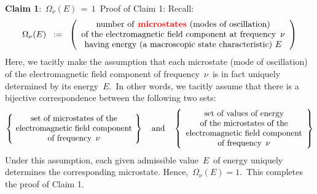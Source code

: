 \vskip 0.4cm
\noindent
\textbf{Claim 1}:\;\,
$\Omega_{\nu}(E) \,=\, 1$\,
\vskip 0.1cm
\noindent
Proof of Claim 1:\;\;
Recall:
\begin{equation*}
\Omega_{\nu}(E)
\;\; := \;\;
    \left(\begin{array}{c}
        \textnormal{number of \textbf{\color{red}microstates} (modes of oscillation)}
        \\
        \textnormal{of the electromagnetic field component at frequency \,$\nu$}
        \\
        \textnormal{having energy (a macroscopic state characteristic) $E$}
        \end{array}\right)
\end{equation*}
Here, we tacitly make the assumption that each microstate (mode of oscillation)
of the electromagnetic field component of frequency \,$\nu$\, is in fact
uniquely determined by its energy \,$E$.\,
In other words, we tacitly assume that there is a bijective correspondence
between the following two sets:
\begin{equation*}
\left\{\!\begin{array}{c}
    \textnormal{set of microstates of the}
    \\
    \textnormal{electromagnetic field component}
    \\
    \textnormal{of frequency \,$\nu$}
    \end{array}\!\right\}
\quad\textnormal{and}\quad
\left\{\begin{array}{c}
    \textnormal{set of values of energy}
    \\
    \textnormal{of the microstates of the}
    \\
    \textnormal{electromagnetic field component}
    \\
    \textnormal{of frequency \,$\nu$}
    \end{array}\right\}
\end{equation*}
Under this assumption, each given admissible value \,$E$\, of energy
uniquely determines the corresponding microstate.
Hence, \,$\Omega_{\nu}(E) = 1$.\,
This completes the proof of Claim 1.

